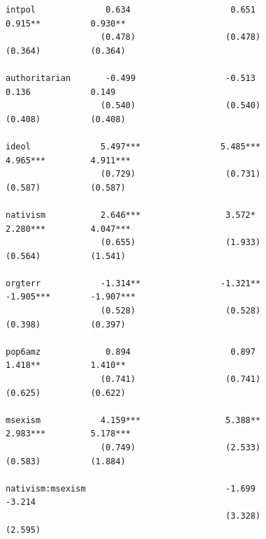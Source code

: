 \documentclass[
  letterpaper,
  DIV=11,
  numbers=noendperiod]{scrartcl}
\begin{document}
\begin{verbatim}
intpol              0.634                    0.651                  0.915**          0.930**        
                   (0.478)                  (0.478)                 (0.364)          (0.364)        
                                                                                                    
authoritarian       -0.499                  -0.513                   0.136            0.149         
                   (0.540)                  (0.540)                 (0.408)          (0.408)        
                                                                                                    
ideol              5.497***                5.485***                 4.965***         4.911***       
                   (0.729)                  (0.731)                 (0.587)          (0.587)        
                                                                                                    
nativism           2.646***                 3.572*                  2.280***         4.047***       
                   (0.655)                  (1.933)                 (0.564)          (1.541)        
                                                                                                    
orgterr            -1.314**                -1.321**                -1.905***        -1.907***       
                   (0.528)                  (0.528)                 (0.398)          (0.397)        
                                                                                                    
pop6amz             0.894                    0.897                  1.418**          1.410**        
                   (0.741)                  (0.741)                 (0.625)          (0.622)        
                                                                                                    
msexism            4.159***                 5.388**                 2.983***         5.178***       
                   (0.749)                  (2.533)                 (0.583)          (1.884)        
                                                                                                    
nativism:msexism                            -1.699                                    -3.214        
                                            (3.328)                                  (2.595)        
                                                                                                    

\end{verbatim}
\end{document}
